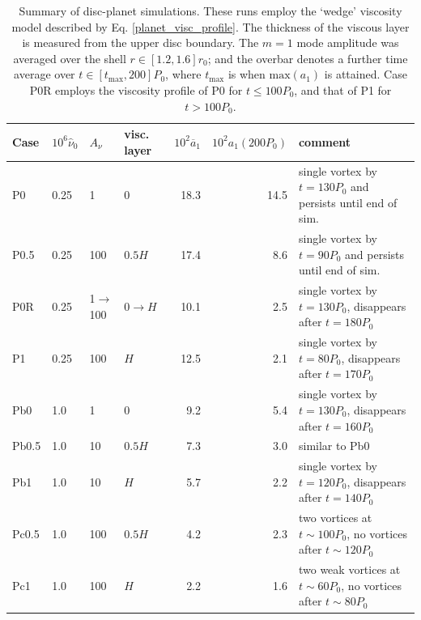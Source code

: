 \begin{table}
  \centering
  \caption{Summary of disc-planet simulations. These runs employ the
    `wedge' viscosity model described by
    Eq. \ref{planet_visc_profile}. The thickness of the viscous layer
    is measured from the upper disc boundary. The $m=1$ mode amplitude was 
    averaged over the shell $r\in[1.2,1.6]r_0$; and the overbar
    denotes a further time average over    
    $t\in[t_\mathrm{max},200]P_0$, where $t_\mathrm{max}$ is when
    $\mathrm{max}(a_1)$ is attained. Case P0R employs the
    viscosity profile of P0 for $t\leq100P_0$, and that of P1 for 
    $t>100P_0$.\label{planet_sims}}
    \begin{tabular}{llllrrl}
      \hline\hline
      Case & $10^6\hat{\nu}_0$ & $A_\nu$ & visc. layer&
      $10^2\overline{a}_1$&$10^2a_1(200P_0)$ & comment \\ 
      \hline
      P0     & 0.25  & 1            & 0     & 18.3  & 14.5 & single vortex
       by $t=130P_0$ and persists until end of sim.  \\ %
      P0.5   & 0.25  & 100          & $0.5H$ &  17.4  & 8.6& single vortex
      by $t=90P_0$ and persists until end of sim.\\ 
      P0R    & 0.25  & 1$\to$100    & $0\to H$& 10.1 & 2.5& single vortex
      by $t=130P_0$, disappears after $t=180P_0$ \\
      P1     & 0.25  & 100          & $H$    & 12.5  & 2.1 &single vortex
      by $t=80P_0$, disappears after $t=170P_0$ \\   %
      

      Pb0     & 1.0  & 1          & 0      & 9.2  & 5.4 &single vortex by $t=130P_0$, disappears
       after $t=160P_0$   \\ %
      Pb0.5   & 1.0  & 10         & $0.5H$ & 7.3  & 3.0 &similar to Pb0     \\ 
      Pb1     & 1.0  & 10         & $H$    & 5.7  & 2.2   &single vortex
      by $t=120P_0$, disappears after $t=140P_0$   \\ %

      Pc0.5   & 1.0  & 100          & $0.5H$ & 4.2  &  2.3 &two vortices
      at $t\sim100P_0$, no vortices after $t\sim120P_0$   \\ %
      Pc1     & 1.0  & 100          & $H$    & 2.2 &  1.6 &two weak vortices at
      $t\sim60P_0$, no vortices after $t\sim 80P_0$\\ %
      \hline
  \end{tabular}
\end{table}

